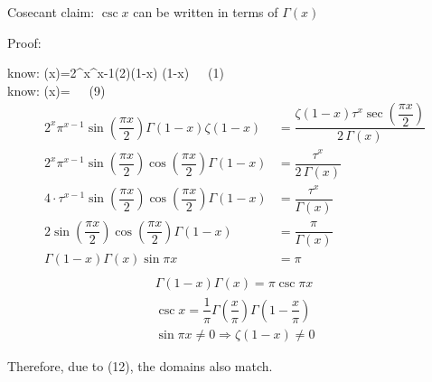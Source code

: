 \documentclass[12pt]{article}
\begin{document}
\pagebreak\begin{section}{Cosecant}
	claim: $\csc x$ can be written in terms of $\Gamma(x)$

	\noindent Proof:

	\noindent know: \zeta(x)=2^x\pi^{x-1}\sin\left(2\right)\Gamma(1-x)
	\zeta(1-x)~~~(1)\\
	
	\noindent know: \zeta(x)=~~~(9)\\

	\begin{align*}
		2^x\pi^{x-1}\sin\left(\dfrac{\pi x}2\right)\Gamma(1-x)\zeta(1-x) & =\dfrac{\zeta(1-x)
		\tau^x\sec\left(\dfrac{\pi x}2\right)}{2\,\Gamma(x)}\\
		2^x\pi^{x-1}\sin\left(\dfrac{\pi x}2\right)\cos\left(\dfrac{\pi x}2\right)\Gamma(1-x) &
		=\dfrac{\tau^x}{2\,\Gamma(x)}\\
		4\cdot\tau^{x-1}\sin\left(\dfrac{\pi x}2\right)\cos\left(\dfrac{\pi x}2\right)\Gamma(1-x)
		& =\dfrac{\tau^x}{\Gamma(x)}\\
		2\sin\left(\dfrac{\pi x}2\right)\cos\left(\dfrac{\pi x}2\right)\Gamma(1-x) & =
		\dfrac{\pi}{\Gamma(x)}\\
		\Gamma(1-x)\Gamma(x)\sin\pi x & =\pi\\
	\end{align*}
	\begin{align} %
		\Gamma(1-x)\Gamma(x)=\pi\csc\pi x\\
		\csc x=\dfrac1\pi\Gamma\left(\dfrac x\pi\right)\Gamma\left(1-\dfrac x\pi\right)\\
		\sin\pi x\ne0\Longrightarrow\zeta(1-x)\ne0
	\end{align}

	\noindent\centerline{Therefore, due to (12), the domains also match.}

	\noindent\blacksquare
\end{section}
\end{document}
